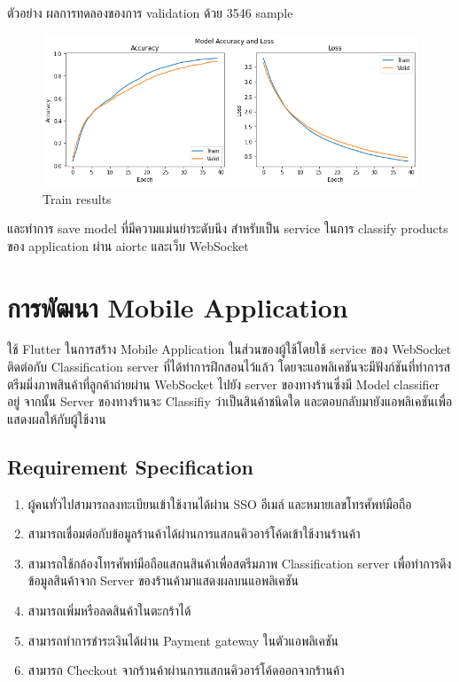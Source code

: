 ตัวอย่าง ผลการทดลองของการ validation ด้วย 3546 sample
\begin{figure}[h]
  \begin{center}
  
  \includegraphics[scale=0.45]{pic/train.png}
  \end{center}
  
  \caption[Train results]{Train results}
  \label{fig:Train results}
  \end{figure}


  และทำการ save model ที่มีความแม่นยำระดับนึง
   สำหรับเป็น service ในการ classify products ของ application ผ่าน aiortc  และเว็บ WebSocket

 
 
\newpage

\section{การพัฒนา Mobile Application}
ใช้ Flutter ในการสร้าง Mobile Application ในส่วนของผู้ใช้โดยใช้ service ของ WebSocket ติดต่อกับ Classification server ที่ได้ทำการฝึกสอนไว้แล้ว
โดยจะแอพลิเคชันจะมีฟังก์ชันที่ทำการสตรีมมิ่งภาพสินค้าที่ลูกค้าถ่ายผ่าน WebSocket ไปยัง server ของทางร้านซึ่งมี Model classifier อยู่
จากนั้น Server ของทางร้านจะ Classifiy ว่าเป็นสินค้าชนิดใด และตอบกลับมายังแอพลิเคชันเพื่อแสดงผลให้กับผู้ใช้งาน
\subsection{Requirement Specification}  

\begin{enumerate}
  \item ผู้คนทั่วไปสามารถลงทะเบียนเข้าใช้งานได้ผ่าน SSO อีเมล์ และหมายเลขโทรศัพท์มือถือ
  \item สามารถเชื่อมต่อกับข้อมูลร้านค้าได้ผ่านการแสกนคิวอาร์โค้ดเข้าใช้งานร้านค้า
  \item สามารถใช้กล้องโทรศัพท์มือถือแสกนสินค้าเพื่อสตรีมภาพ Classification server เพื่อทำการดึงข้อมูลสินค้าจาก Server ของร้านค้ามาแสดงผลบนแอพลิเคชัน
  \item สามารถเพิ่มหรือลดสินค้าในตะกร้าได้
  \item สามารถทำการชำระเงินได้ผ่าน Payment gateway ในตัวแอพลิเคชัน
  \item สามารถ Checkout จากร้านค้าผ่านการแสกนคิวอาร์โค้ดออกจากร้านค้า
 
\end{enumerate}


